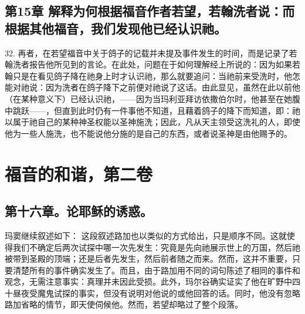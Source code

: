 
\subsection{第15章 解释为何根据福音作者若望，若翰洗者说：而根据其他福音，我们发现他已经认识祂。}

32. 再者，在若望福音中关于鸽子的记载并未提及事件发生的时间，而是记录了若翰洗者报告他所见到的言论。在此处，问题在于如何理解经上所说的：因为如果若翰只是在看见鸽子降在祂身上时才认识祂，那么就要追问：当祂前来受洗时，他怎能对祂说：因为洗者在鸽子降下之前便对祂说了这话。由此显见，虽然在此以前他（在某种意义下）已经认识祂，——因为当玛利亚拜访依撒伯尔时，他甚至在她腹中跳跃——，但直到此时仍有一件事他不知道，且藉着鸽子的降下而知道，即：祂以属于祂自己的某种神圣权能以圣神施洗；因此，凡从天主领受这洗礼的人，即使他为一些人施洗，也不能说他分施的是自己的东西，或者说圣神是由他赐予的。\par



\section{福音的和谐，第二卷}


\subsection{第十六章。论耶稣的诱惑。}

玛窦继续叙述如下： 这段叙述路加也以类似的方式给出，只是顺序不同。这就使得我们不确定后两次试探中哪一次先发生：究竟是先向祂展示世上的万国，然后祂被带到圣殿的顶端；还是后者先发生，然后前者随之而来。然而，这并不重要，只要清楚所有的事件确实发生了。而且，由于路加用不同的词句陈述了相同的事件和观念，无需注意事实：真理并未因此受损。此外，玛尔谷确实证实了他在旷野中四十昼夜受魔鬼试探的事实，但没有说明对他说的或他回答的话。同时，他没有忽略路加省略的情节，即天使伺候他。然而，若望却略过了整个段落。\par

